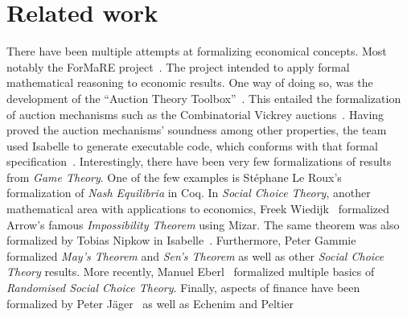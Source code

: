 \documentclass[11pt,a4paper]{article}
\begin{document}
\section{Related work}
%
There have been multiple attempts at formalizing economical concepts.
Most notably the ForMaRE project~\cite{DBLP:conf/mkm/0002RK13}. The
project intended to apply formal mathematical reasoning to economic
results. One way of doing so, was the development of the ``Auction
Theory Toolbox''~\cite{kerber2013developing}. This entailed the
formalization of auction mechanisms such as the Combinatorial Vickrey
auctions~\cite{DBLP:journals:corr:CaminatiK0R13}. Having proved the
auction mechanisms' soundness among other properties, the team used
Isabelle to generate executable code, which conforms with that formal
specification~\cite{DBLP:journals:corr:CaminatiK0R13}.
%
Interestingly, there have been very few formalizations of results from
\emph{Game Theory}. One of the few examples is St{\'{e}}phane Le
Roux's~\cite{DBLP:conf/tphol/Roux09} formalization of \emph{Nash
  Equilibria} in Coq. In \emph{Social Choice Theory}, another
mathematical area with applications to economics, Freek
Wiedijk~\cite{Wiedijk2009} formalized Arrow's famous
\emph{Impossibility Theorem} using Mizar. The same theorem was also
formalized by Tobias Nipkow in
Isabelle~\cite{DBLP:journals/afp/Nipkow08b}. Furthermore, Peter
Gammie~\cite{SenSocialChoice-AFP} formalized \emph{May's Theorem} and
\emph{Sen's Theorem} as well as other \emph{Social Choice Theory}
results. More recently, Manuel
Eberl~\cite{Randomised_Social_Choice-AFP} formalized multiple basics
of \emph{Randomised Social Choice Theory}. Finally, aspects of finance
have been formalized by Peter J{\"a}ger~\cite{PeterJaeger2012} as well as 
Echenim and Peltier~\cite{DBLP:conf/cade/EchenimP17}




\end{document}

